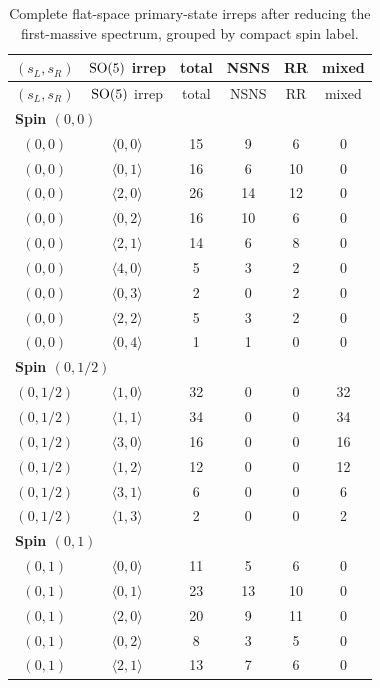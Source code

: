 \begin{longtable}{c c c c c c}
\caption{Complete flat-space primary-state irreps after reducing the first-massive spectrum, grouped by compact spin label.}\label{tab:flat-full}\\
\toprule
$(s_L,s_R)$ & $\mathrm{SO}(5)$ irrep & total & NSNS & RR & mixed \\
\midrule
\endfirsthead
\toprule
$(s_L,s_R)$ & $\mathrm{SO}(5)$ irrep & total & NSNS & RR & mixed \\
\midrule
\endhead
\multicolumn{6}{l}{\textbf{Spin $(0,0)$}}\\
$(0,0)$ & $\langle 0,0\rangle$ & 15 & 9 & 6 & 0 \\
$(0,0)$ & $\langle 0,1\rangle$ & 16 & 6 & 10 & 0 \\
$(0,0)$ & $\langle 2,0\rangle$ & 26 & 14 & 12 & 0 \\
$(0,0)$ & $\langle 0,2\rangle$ & 16 & 10 & 6 & 0 \\
$(0,0)$ & $\langle 2,1\rangle$ & 14 & 6 & 8 & 0 \\
$(0,0)$ & $\langle 4,0\rangle$ & 5 & 3 & 2 & 0 \\
$(0,0)$ & $\langle 0,3\rangle$ & 2 & 0 & 2 & 0 \\
$(0,0)$ & $\langle 2,2\rangle$ & 5 & 3 & 2 & 0 \\
$(0,0)$ & $\langle 0,4\rangle$ & 1 & 1 & 0 & 0 \\
\midrule
\multicolumn{6}{l}{\textbf{Spin $(0,1/2)$}}\\
$(0,1/2)$ & $\langle 1,0\rangle$ & 32 & 0 & 0 & 32 \\
$(0,1/2)$ & $\langle 1,1\rangle$ & 34 & 0 & 0 & 34 \\
$(0,1/2)$ & $\langle 3,0\rangle$ & 16 & 0 & 0 & 16 \\
$(0,1/2)$ & $\langle 1,2\rangle$ & 12 & 0 & 0 & 12 \\
$(0,1/2)$ & $\langle 3,1\rangle$ & 6 & 0 & 0 & 6 \\
$(0,1/2)$ & $\langle 1,3\rangle$ & 2 & 0 & 0 & 2 \\
\midrule
\multicolumn{6}{l}{\textbf{Spin $(0,1)$}}\\
$(0,1)$ & $\langle 0,0\rangle$ & 11 & 5 & 6 & 0 \\
$(0,1)$ & $\langle 0,1\rangle$ & 23 & 13 & 10 & 0 \\
$(0,1)$ & $\langle 2,0\rangle$ & 20 & 9 & 11 & 0 \\
$(0,1)$ & $\langle 0,2\rangle$ & 8 & 3 & 5 & 0 \\
$(0,1)$ & $\langle 2,1\rangle$ & 13 & 7 & 6 & 0 \\

\end{longtable}

